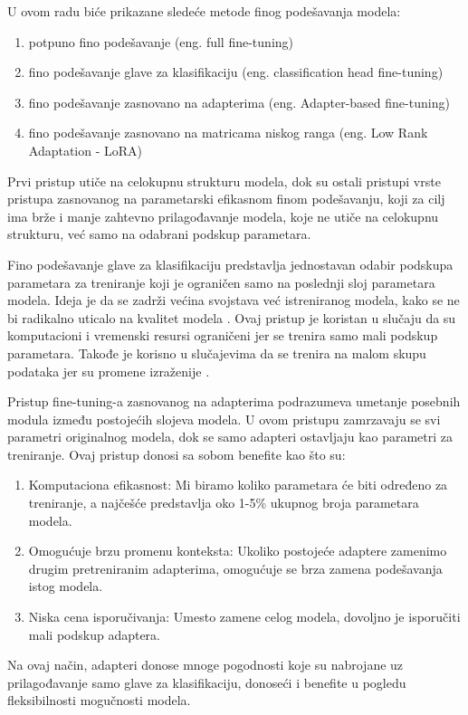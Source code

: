 \documentclass[12pt,oneside]{memoir}
\begin{document}
U ovom radu biće prikazane sledeće metode finog podešavanja modela:
\begin{enumerate}
	\item potpuno fino podešavanje (eng. full fine-tuning)
	\item fino podešavanje glave za klasifikaciju (eng. classification head fine-tuning) \cite{ClassificationHeadTechnique}
	\item fino podešavanje zasnovano na adapterima (eng. Adapter-based fine-tuning) \cite{AdaptersTechnique}
	\item fino podešavanje zasnovano na matricama niskog ranga (eng. Low Rank Adaptation - LoRA) \cite{LoRATechnique} 
\end{enumerate}

Prvi pristup utiče na celokupnu strukturu modela, dok su ostali pristupi vrste pristupa zasnovanog na parametarski efikasnom finom podešavanju, koji za cilj ima brže i manje zahtevno prilagođavanje modela, koje ne utiče na celokupnu strukturu, već samo na odabrani podskup parametara.

Fino podešavanje glave za klasifikaciju predstavlja jednostavan odabir podskupa parametara za treniranje koji je ograničen samo na poslednji sloj parametara modela. Ideja je da se zadrži većina svojstava već istreniranog modela, kako se ne bi radikalno uticalo na kvalitet modela \cite{BenefitOfClassificationHeadTuning}. Ovaj pristup je koristan u slučaju da su komputacioni i vremenski resursi ograničeni jer se trenira samo mali podskup parametara. Takođe je korisno u slučajevima da se trenira na malom skupu podataka jer su promene izraženije \cite{TuningHeadResources}.

Pristup fine-tuning-a zasnovanog na adapterima podrazumeva umetanje posebnih modula između postojećih slojeva modela. U ovom pristupu zamrzavaju se svi parametri originalnog modela, dok se samo adapteri ostavljaju kao parametri za treniranje. Ovaj pristup donosi sa sobom benefite kao što su:
\begin{enumerate}
\item Komputaciona efikasnost: Mi biramo koliko parametara će biti određeno za treniranje, a najčešće predstavlja oko 1-5\% ukupnog broja parametara modela. 
\item Omogućuje brzu promenu konteksta: Ukoliko postojeće adaptere zamenimo drugim pretreniranim adapterima, omogućuje se brza zamena podešavanja istog modela.
\item Niska cena isporučivanja: Umesto zamene celog modela, dovoljno je isporučiti mali podskup adaptera.
\end{enumerate}
Na ovaj način, adapteri donose mnoge pogodnosti koje su nabrojane uz prilagođavanje samo glave za klasifikaciju, donoseći i benefite u pogledu fleksibilnosti mogučnosti modela.
\end{document}
